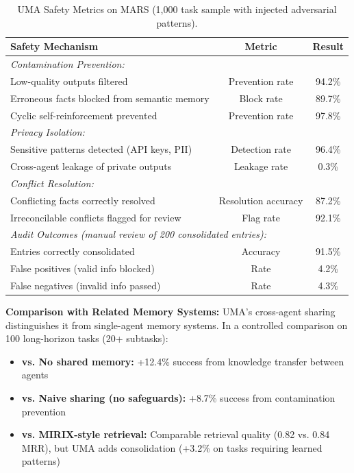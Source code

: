 \documentclass{article}
\theoremstyle{plain}
\theoremstyle{definition}
\theoremstyle{remark}
\begin{document}
\begin{table}[h]
	\caption{UMA Safety Metrics on MARS (1,000 task sample with injected adversarial patterns).}
	\label{tab:uma_safety}
	\centering
	\small
	\begin{tabular}{@{}lcc@{}}
		\toprule
		\textbf{Safety Mechanism} & \textbf{Metric} & \textbf{Result} \\
		\midrule
		\multicolumn{3}{l}{\textit{Contamination Prevention:}} \\
		\quad Low-quality outputs filtered & Prevention rate & 94.2\% \\
		\quad Erroneous facts blocked from semantic memory & Block rate & 89.7\% \\
		\quad Cyclic self-reinforcement prevented & Prevention rate & 97.8\% \\
		\midrule
		\multicolumn{3}{l}{\textit{Privacy Isolation:}} \\
		\quad Sensitive patterns detected (API keys, PII) & Detection rate & 96.4\% \\
		\quad Cross-agent leakage of private outputs & Leakage rate & 0.3\% \\
		\midrule
		\multicolumn{3}{l}{\textit{Conflict Resolution:}} \\
		\quad Conflicting facts correctly resolved & Resolution accuracy & 87.2\% \\
		\quad Irreconcilable conflicts flagged for review & Flag rate & 92.1\% \\
		\midrule
		\multicolumn{3}{l}{\textit{Audit Outcomes (manual review of 200 consolidated entries):}} \\
		\quad Entries correctly consolidated & Accuracy & 91.5\% \\
		\quad False positives (valid info blocked) & Rate & 4.2\% \\
		\quad False negatives (invalid info passed) & Rate & 4.3\% \\
		\bottomrule
	\end{tabular}
\end{table}

\textbf{Comparison with Related Memory Systems:} UMA's cross-agent sharing distinguishes it from single-agent memory systems. In a controlled comparison on 100 long-horizon tasks (20+ subtasks):
\begin{itemize}[nosep,leftmargin=*]
	\item \textbf{vs. No shared memory:} +12.4\% success from knowledge transfer between agents
	\item \textbf{vs. Naive sharing (no safeguards):} +8.7\% success from contamination prevention
	\item \textbf{vs. MIRIX-style retrieval:} Comparable retrieval quality (0.82 vs. 0.84 MRR), but UMA adds consolidation (+3.2\% on tasks requiring learned patterns)
\end{itemize}
\end{document}
